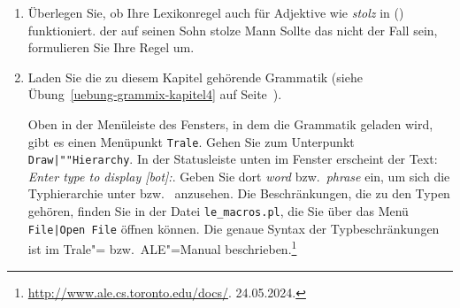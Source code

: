{\begin{enumerate}
\item Überlegen Sie, ob Ihre Lexikonregel auch für Adjektive wie \emph{stolz} in ()
  funktioniert.
\ea
der auf seinen Sohn stolze Mann
\z
Sollte das nicht der Fall sein, formulieren Sie Ihre Regel um.

\item Laden Sie die zu diesem Kapitel gehörende Grammatik 
(siehe Übung~\ref{uebung-grammix-kapitel4} auf Seite~\pageref{uebung-grammix-kapitel4}).

Oben in der Menüleiste des Fensters, in dem die Grammatik geladen wird, gibt es einen Menüpunkt \texttt{Trale}.
Gehen Sie zum  Unterpunkt \texttt{Draw|""Hierarchy}. 
In der Statusleiste unten im Fenster erscheint der Text: \emph{Enter type to display [bot]:}.
Geben Sie dort \emph{word} bzw.\ \emph{phrase} ein, um sich die Typhierarchie unter
 bzw.\  anzusehen. Die Beschränkungen, die zu den Typen gehören, finden
Sie in der Datei \texttt{le\_macros.pl}, die Sie über das Menü \texttt{File|Open File} öffnen können.
Die genaue Syntax der Typbeschränkungen ist im Trale"= bzw.\ ALE"=Manual beschrieben.\footnote{
\url{http://www.ale.cs.toronto.edu/docs/}. 24.05.2024.%
}
\end{enumerate}
}




